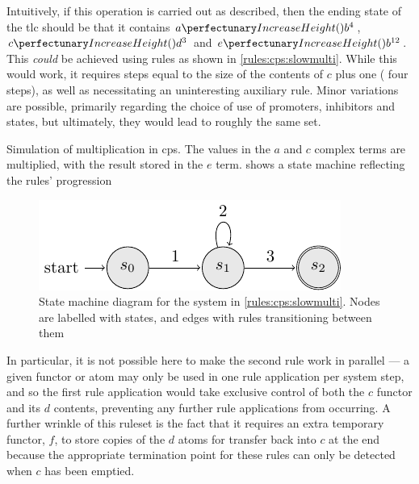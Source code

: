 Intuitively, if this operation is carried out as described, then the ending state of the \gls{tlc} should be that it contains \(\cpfunc{a}{b^4}\), \(\cpfunc{c}{d^3}\) and \(\cpfunc{e}{b^{12}}\).  This \emph{could} be achieved using rules as shown in \cref{rules:cps:slowmulti}.  While this would work, it requires steps equal to the size of the contents of \(c\) plus one (\ie{} four steps), as well as necessitating an uninteresting auxiliary rule.  Minor variations are possible, primarily regarding the choice of use of promoters, inhibitors and states, but ultimately, they would lead to roughly the same set.

\begin{cprulesetfloat}
    \begin{cpruleset}
        
    
    \end{cpruleset}
    \caption[Simulation of multiplication in cP systems]{\label{rules:cps:slowmulti}Simulation of multiplication in \gls{cps}.  The values in the \(a\) and \(c\) complex terms are multiplied, with the result stored in the \(e\) term.   shows a state machine reflecting the rules' progression}
\end{cprulesetfloat}

\begin{figure}
    \centering
    \includegraphics{chapters/cpsystems/ruleset1statemachine.pdf}
    \caption[State machine diagram for the system in \cref{rules:cps:slowmulti}]{State machine diagram for the system in \cref{rules:cps:slowmulti}.  Nodes are labelled with states, and edges with rules transitioning between them}
    \label{fig:cps:slowmulti}
\end{figure}

In particular, it is not possible here to make the second rule work in parallel --- a given functor or atom may only be used in one rule application per system step, and so the first rule application would take exclusive control of both the \(c\) functor and its \(d\) contents, preventing any further rule applications from occurring.  A further wrinkle of this \gls{ruleset} is the fact that it requires an extra temporary functor, \(f\), to store copies of the \(d\) atoms for transfer back into \(c\) at the end because the appropriate termination point for these rules can only be detected when \(c\) has been emptied.

